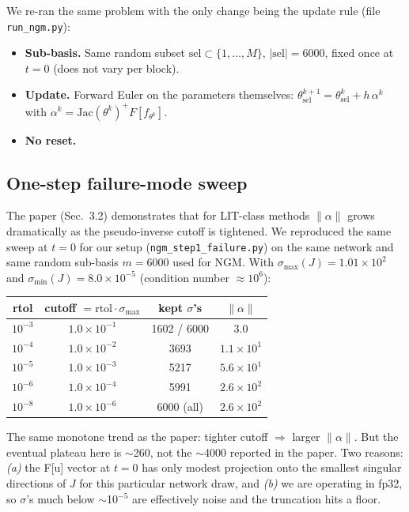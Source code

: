 \documentclass[11pt]{article}
\newcommand{\code}[1]{\texttt{\small #1}}
\begin{document}
We re-ran the same problem with the only change being the update
rule (file \code{run\_ngm.py}):
\begin{itemize}\itemsep0pt
  \item \textbf{Sub-basis.} Same random subset
        $\mathrm{sel}\subset\{1,\dots,M\}$, $|\mathrm{sel}|=6000$,
        fixed once at $t=0$ (does not vary per block).
  \item \textbf{Update.} Forward Euler on the parameters themselves:
        $\theta^{k+1}_\mathrm{sel} = \theta^k_\mathrm{sel} + h\,\alpha^k$
        with $\alpha^k = \mathrm{Jac}(\theta^k)^{+} F[f_{\theta^k}]$.
  \item \textbf{No reset.}
\end{itemize}

\subsection*{One-step failure-mode sweep}

The paper (Sec.~3.2) demonstrates that for LIT-class methods $\|\alpha\|$
grows dramatically as the pseudo-inverse cutoff is tightened. We
reproduced the same sweep at $t=0$ for our setup (\code{ngm\_step1\_failure.py})
on the same network and same random sub-basis $m=6000$ used for
NGM. With $\sigma_{\max}(J)=1.01{\times}10^2$ and
$\sigma_{\min}(J)=8.0{\times}10^{-5}$ (condition number $\approx 10^6$):

\begin{center}
\small
\begin{tabular}{cccc}
  \toprule
  rtol & cutoff $= \mathrm{rtol}\cdot\sigma_{\max}$ & kept $\sigma$'s & $\|\alpha\|$ \\
  \midrule
  $10^{-3}$ & $1.0{\times}10^{-1}$ & 1602 / 6000 & $3.0$ \\
  $10^{-4}$ & $1.0{\times}10^{-2}$ & 3693 & $1.1{\times}10^1$ \\
  $10^{-5}$ & $1.0{\times}10^{-3}$ & 5217 & $5.6{\times}10^1$ \\
  $10^{-6}$ & $1.0{\times}10^{-4}$ & 5991 & $2.6{\times}10^2$ \\
  $10^{-8}$ & $1.0{\times}10^{-6}$ & 6000 (all) & $2.6{\times}10^2$ \\
  \bottomrule
\end{tabular}
\end{center}

The same monotone trend as the paper: tighter cutoff $\Rightarrow$
larger $\|\alpha\|$. But the eventual plateau here is $\sim$260, not
the $\sim$4000 reported in the paper. Two reasons: \emph{(a)} the
F[u] vector at $t=0$ has only modest projection onto the smallest
singular directions of $J$ for this particular network draw, and
\emph{(b)} we are operating in fp32, so $\sigma$'s much below $\sim$10$^{-5}$
are effectively noise and the truncation hits a floor.
\end{document}
